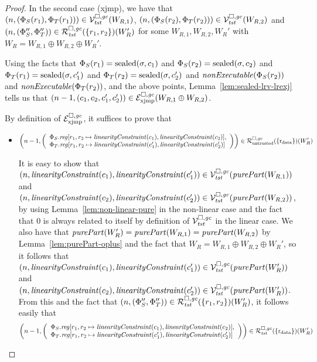 \begin{proof}
  In the second case (xjmp), we have that $\npair{(\Phi_S(r_1),\Phi_T(r_1))} \in \lrvg{\trust}(W_{R,1})$, $\npair{(\Phi_S(r_2),\Phi_T(r_2))} \in \lrvg{\trust}(W_{R,2})$ and $\npair{(\Phi_S'',\Phi_T'')} \in \lrrg{\trust}(\{r_1,r_2\})(W_R')$ for some $W_{R,1}, W_{R,2}, W_R'$ with $W_R = W_{R,1} \oplus W_{R,2} \oplus W_R'$.

  Using the facts that $\Phi_S(r_1) = \sealed{\sigma,c_1}$ and $\Phi_S(r_2) = \sealed{\sigma,c_2}$ and $\Phi_T(r_1) = \sealed{\sigma,c_1'}$ and $\Phi_T(r_2) = \sealed{\sigma,c_2'}$ and $\nonExec{\Phi_S(r_2)}$ and $\nonExec{\Phi_T(r_2)}$, and the above points, Lemma~\ref{lem:sealed-lrv-lrexj} tells us that $\npair[n-1]{(c_1,c_2,c_1',c_2')} \in \lrexj(W_{R,1} \oplus W_{R,2})$. 

  By definition of $\lrexj$, it suffices to prove that
  \begin{itemize}
  \item
    \begin{equation*}
      \npair[n-1]{\left(\array{l}\Phi_S.\reg\update{r_1,r_2}{\linCons{c_1},\linCons{c_2}},\\ \Phi_T.\reg\update{r_1,r_2}{\linCons{c_1'},\linCons{c_2'}}\endarray\right)} \in
      \lrr(\{\rdata\})(W_R')
    \end{equation*}

    It is easy to show that $\npair{\linCons{c_1},\linCons{c_1'}} \in \lrvg{\trust}(\purePart{W_{R,1}})$ and $\npair{\linCons{c_2},\linCons{c_2'}} \in \lrvg{\trust}(\purePart{W_{R,2}})$, by using Lemma~\ref{lem:non-linear-pure} in the non-linear case and the fact that $0$ is always related to itself by definition of $\lrvg{\trust}$ in the linear case.
    We also have that $\purePart{W_R'} = \purePart{W_{R,1}} = \purePart{W_{R,2}}$ by Lemma~\ref{lem:purePart-oplus} and the fact that $W_R = W_{R,1} \oplus W_{R,2} \oplus W_R'$, so it follows that $\npair{\linCons{c_1},\linCons{c_1'}} \in \lrvg{\trust}(\purePart{W_R'})$ and $\npair{\linCons{c_2},\linCons{c_2'}} \in \lrvg{\trust}(\purePart{W_R'})$.
    From this and the fact that $\npair{(\Phi_S'',\Phi_T'')} \in \lrrg{\trust}(\{r_1,r_2\})(W_R')$, it follows easily that
    \begin{equation*}
      \npair[n-1]{\left(\array{l}\Phi_S.\reg\update{r_1,r_2}{\linCons{c_1},\linCons{c_2}},\\ \Phi_T.\reg\update{r_1,r_2}{\linCons{c_1'},\linCons{c_2'}}\endarray\right)} \in
      \lrrg{\trust}(\{\rdata\})(W_R')
    \end{equation*}


\end{itemize}
\end{proof}
